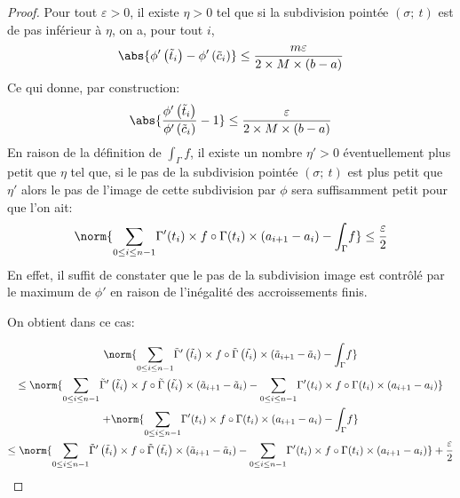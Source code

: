 \begin{proof}
Pour tout $\varepsilon > 0$, il existe $\eta > 0$ tel que si la subdivision pointée $(\sigma;~t)$ est de pas inférieur à $\eta$, on a, pour tout $i$, 
\[
\abs{\phi'\left(\tilde{t}_i\right)-\phi'\left(\tilde{c}_i\right)} \leq \dfrac{m \varepsilon}{2 \times M \times (b-a)}
\]
Ce qui donne, par construction:
\[
\abs{\dfrac{\phi'\left(\tilde{t}_i\right)}{\phi'\left(\tilde{c}_i\right)}-1} \leq \dfrac{\varepsilon}{2 \times M \times (b-a)}
\]
En raison de la définition de $\displaystyle{\int_{\Gamma}} f$, il existe un nombre $\eta'>0$ éventuellement plus petit que $\eta$ tel que, si le pas de la subdivision pointée $(\sigma;~t)$ est plus petit que $\eta'$ alors le pas de l'image de cette subdivision par $\phi$ sera suffisamment petit pour que l'on ait:
\[
\norm{\displaystyle{\sum \limits_{0 \leq i \leq n-1}}  \Gamma'(t_i) \times f\circ \Gamma(t_i) \times \left(a_{i+1}-a_i\right) - \displaystyle{\int_{\Gamma}} f} \leq \dfrac{\varepsilon}{2}
\]
En effet, il suffit de constater que le pas de la subdivision image est contrôlé par le maximum de $\phi'$ en raison de l'inégalité des accroissements finis.

On obtient dans ce cas:

\begin{multline*}
\norm{\displaystyle{\sum \limits_{0 \leq i \leq n-1}} \tilde{\Gamma}'\left(\tilde{t}_i\right) \times f\circ \tilde{\Gamma}\left(\tilde{t_i}\right) \times \left(\tilde{a}_{i+1}-\tilde{a}_i\right) - \displaystyle{\int_{\Gamma}} f}  \\
\leq \norm{\displaystyle{\sum \limits_{0 \leq i \leq n-1}} \tilde{\Gamma}'\left(\tilde{t}_i\right) \times f\circ \tilde{\Gamma}\left(\tilde{t_i}\right) \times \left(\tilde{a}_{i+1}-\tilde{a}_i\right) - \displaystyle{\sum \limits_{0 \leq i \leq n-1}}   \Gamma'(t_i) \times f\circ \Gamma(t_i) \times \left(a_{i+1}-a_i\right)} \\
+ \norm{\displaystyle{\sum \limits_{0 \leq i \leq n-1}} \Gamma'(t_i) \times f\circ \Gamma(t_i) \times \left(a_{i+1}-a_i\right)- \displaystyle{\int_{\Gamma}} f}\\
\leq \norm{\displaystyle{\sum \limits_{0 \leq i \leq n-1}} \tilde{\Gamma}'\left(\tilde{t}_i\right) \times f\circ \tilde{\Gamma}\left(\tilde{t_i}\right) \times \left(\tilde{a}_{i+1}-\tilde{a}_i\right) - \displaystyle{\sum \limits_{0 \leq i \leq n-1}}   \Gamma'(t_i) \times f\circ \Gamma(t_i) \times \left(a_{i+1}-a_i\right)} + \dfrac{\varepsilon}{2}
\end{multline*}


\end{proof}
